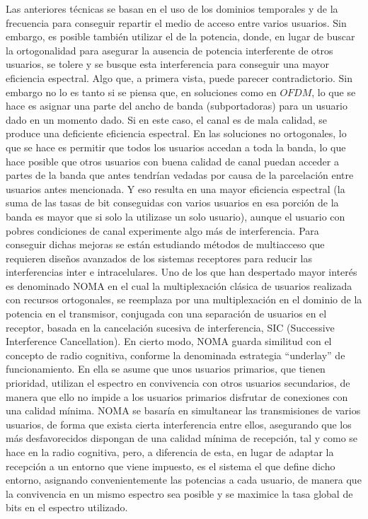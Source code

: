 \documentclass[]{article}
\begin{document}
Las anteriores técnicas se basan en el uso de los dominios temporales y de la frecuencia para conseguir repartir el medio de acceso entre varios usuarios. Sin embargo, es posible también utilizar el de la potencia, donde, en lugar de buscar la ortogonalidad para asegurar la ausencia de potencia interferente de otros usuarios, se tolere y se busque esta interferencia para conseguir una mayor eficiencia espectral. Algo que, a primera vista, puede parecer contradictorio. Sin embargo no lo es tanto si se piensa que, en soluciones como en $OFDM$, lo que se hace es asignar una parte del ancho de banda (subportadoras) para un usuario dado en un momento dado. Si en este caso, el canal es de mala calidad, se produce una deficiente eficiencia espectral. En las soluciones no ortogonales, lo que se hace es permitir que todos los usuarios accedan a toda la banda, lo que hace posible que otros usuarios con buena calidad de canal puedan acceder a partes de la banda que antes tendrían vedadas por causa de la parcelación entre usuarios antes mencionada. Y eso resulta en una mayor eficiencia espectral (la suma de las tasas de bit conseguidas con varios usuarios en esa porción de la banda es mayor que si solo la utilizase un solo usuario), aunque el usuario con pobres condiciones de canal experimente algo más de interferencia. Para conseguir dichas mejoras se están estudiando métodos de multiacceso que requieren diseños avanzados de los sistemas receptores para reducir las interferencias inter e intracelulares. Uno de los que han despertado mayor interés es denominado NOMA en el cual la multiplexación clásica de usuarios realizada con recursos ortogonales, se reemplaza por una multiplexación en el dominio de la potencia en el transmisor, conjugada con una separación de usuarios en el receptor, basada en la cancelación sucesiva de interferencia, SIC (Successive Interference Cancellation). En cierto modo, NOMA guarda similitud con el concepto de radio cognitiva, conforme la denominada estrategia “underlay” de funcionamiento. En ella se asume que unos usuarios primarios, que tienen prioridad, utilizan el espectro en convivencia con otros usuarios secundarios, de manera que ello no impide a los usuarios primarios disfrutar de conexiones con una calidad mínima. NOMA se basaría en simultanear las transmisiones de varios usuarios, de forma que exista cierta interferencia entre ellos, asegurando que los más desfavorecidos dispongan de una calidad mínima de recepción, tal y como se hace en la radio cognitiva, pero, a diferencia de esta, en lugar de adaptar la recepción a un entorno que viene impuesto, es el sistema el que define dicho entorno, asignando convenientemente las potencias a cada usuario, de manera que la convivencia en un mismo espectro sea posible y se maximice la tasa global de bits en el espectro utilizado.\\
\end{document}
